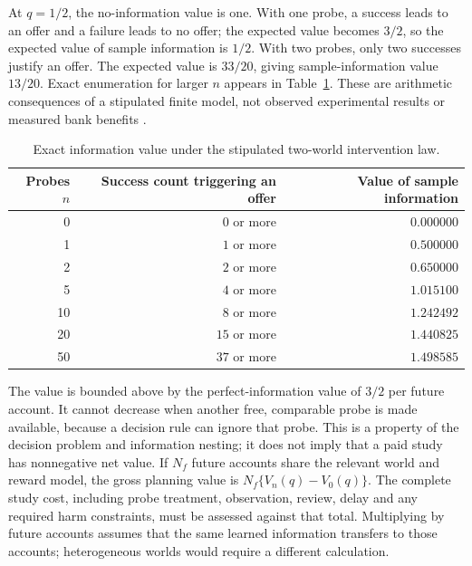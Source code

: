 At $q=1/2$, the no-information value is one. With one probe, a success leads
to an offer and a failure leads to no offer; the expected value becomes
$3/2$, so the expected value of sample information is $1/2$. With two probes,
only two successes justify an offer. The expected value is $33/20$, giving
sample-information value $13/20$. Exact enumeration for larger $n$ appears
in Table~\ref{exec14:l4-evsi-table}. These are arithmetic consequences of a
stipulated finite model, not observed experimental results or measured bank
benefits \citep{exec14_discovery_design_oracles}.



\begin{table}[htbp]
\centering
\caption{Exact information value under the stipulated two-world intervention law.}
\label{exec14:l4-evsi-table}
\begin{tabular}{rrr}
\toprule
Probes $n$ & Success count triggering an offer & Value of sample information\\
\midrule
0 & $0$ or more & $0.000000$\\
1 & $1$ or more & $0.500000$\\
2 & $2$ or more & $0.650000$\\
5 & $4$ or more & $1.015100$\\
10 & $8$ or more & $1.242492$\\
20 & $15$ or more & $1.440825$\\
50 & $37$ or more & $1.498585$\\
\bottomrule
\end{tabular}
\end{table}




The value is bounded above by the perfect-information value of $3/2$ per
future account. It cannot decrease when another free, comparable probe is
made available, because a decision rule can ignore that probe. This is a
property of the decision problem and information nesting; it does not imply
that a paid study has nonnegative net value. If $N_f$ future accounts share
the relevant world and reward model, the gross planning value is
$N_f\{V_n(q)-V_0(q)\}$. The complete study cost, including probe treatment,
observation, review, delay and any required harm constraints, must be assessed
against that total. Multiplying by future accounts assumes that the same
learned information transfers to those accounts; heterogeneous worlds would
require a different calculation.

